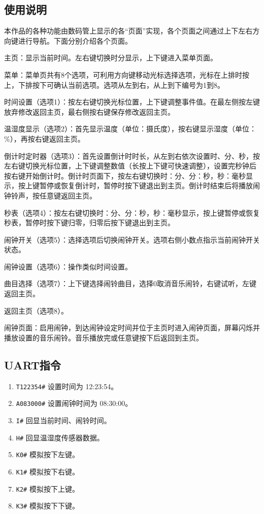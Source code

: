 \documentclass[a4paper,11pt,UTF8]{ctexart}
\begin{document}
\begin{appendix}

    \section{使用说明}

    本作品的各种功能由数码管上显示的各“页面”实现，各个页面之间通过上下左右方向键进行导航。下面分别介绍各个页面。

    主页：显示当前时间。左右键切换时分显示，上下键进入菜单页面。

    菜单：菜单页共有8个选项，可利用方向键移动光标选择选项，光标在上排时按上，下排按下可确认当前选项。选项从左到右，从上到下编号为1到8。

    时间设置（选项1）：按左右键切换光标位置，上下键调整事件值。在最左侧按左键放弃修改返回主页，最右侧按右键保存修改返回主页。

    温湿度显示（选项2）：首先显示温度（单位：摄氏度），按右键显示湿度（单位：\%），再按右键返回主页。

    倒计时定时器（选项3）：首先设置倒计时时长，从左到右依次设置时、分、秒，按左右键切换光标位置，上下键调整数值（长按上下键可快速调整），设置完秒钟后按右键开始倒计时。倒计时页面下，按左右键切换时：分、分：秒，秒：毫秒显示，按上键暂停或恢复倒计时，暂停时按下键退出到主页。倒计时结束后将播放闹钟铃声，按任意键返回主页。

    秒表（选项4）：按左右键切换时：分、分：秒，秒：毫秒显示，按上键暂停或恢复秒表，暂停时按下键归零，归零后按下键退出到主页。

    闹钟开关（选项5）：选择选项后切换闹钟开关。选项右侧小数点指示当前闹钟开关状态。

    闹钟设置（选项6）：操作类似时间设置。

    曲目选择（选项7）：上下键选择闹铃曲目，选择0取消音乐闹铃，右键试听，左键返回主页。

    返回主页（选项8）。

    闹钟页面：启用闹钟，到达闹钟设定时间并位于主页时进入闹钟页面，屏幕闪烁并播放设置的音乐闹铃。音乐播放完或任意键按下后返回到主页。

    \subsection{UART指令}

    \begin{enumerate}
        \item \lstinline{T122354#} 设置时间为 12:23:54。
        \item \lstinline{A083000#} 设置闹钟时间为 08:30:00。
        \item \lstinline{I#} 回显当前时间、闹铃时间。
        \item \lstinline{H#} 回显温湿度传感器数据。
        \item \lstinline{K0#} 模拟按下左键。
        \item \lstinline{K1#} 模拟按下右键。
        \item \lstinline{K2#} 模拟按下上键。
        \item \lstinline{K3#} 模拟按下下键。
    \end{enumerate}


\end{appendix}
\end{document}
